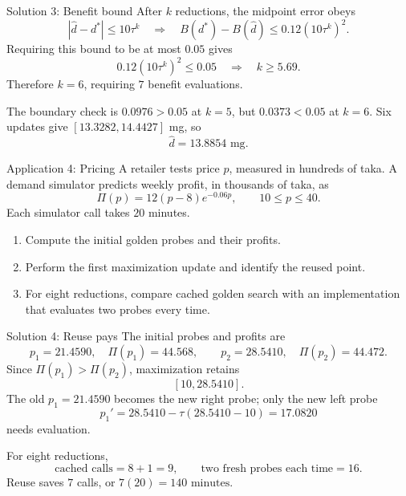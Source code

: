 \documentclass[aspectratio=169,11pt,t]{beamer}
\begin{document}
\begin{frame}{Solution 3: Benefit bound}
  After \(k\) reductions, the midpoint error obeys
  \[
    |\widehat d-d^*|\le10\tau^k
    \quad\Longrightarrow\quad
    B(d^*)-B(\widehat d)\le0.12(10\tau^k)^2.
  \]
  Requiring this bound to be at most \(0.05\) gives
  \[
    0.12(10\tau^k)^2\le0.05
    \quad\Longrightarrow\quad k\ge5.69.
  \]
  Therefore \(\boxed{k=6}\), requiring \(\boxed{7}\) benefit evaluations.

  The boundary check is \(0.0976>0.05\) at \(k=5\), but
  \(0.0373<0.05\) at \(k=6\).
  Six updates give \([13.3282,14.4427]\) mg, so
  \[
    \boxed{\widehat d=13.8854\text{ mg}}.
  \]
\end{frame}

\begin{frame}{Application 4: Pricing}
  A retailer tests price \(p\), measured in hundreds of taka. A demand simulator
  predicts weekly profit, in thousands of taka, as
  \[
    \Pi(p)=12(p-8)e^{-0.06p},
    \qquad 10\le p\le40.
  \]
  Each simulator call takes \(20\) minutes.

  \begin{enumerate}
    \item Compute the initial golden probes and their profits.
    \item Perform the first maximization update and identify the reused point.
    \item For eight reductions, compare cached golden search with an
      implementation that evaluates two probes every time.
  \end{enumerate}
\end{frame}

\begin{frame}{Solution 4: Reuse pays}
  The initial probes and profits are
  \[
    p_1=21.4590,\quad \Pi(p_1)=44.568,
    \qquad
    p_2=28.5410,\quad \Pi(p_2)=44.472.
  \]
  Since \(\Pi(p_1)>\Pi(p_2)\), maximization retains
  \[
    \boxed{[10,28.5410]}.
  \]
  The old \(p_1=21.4590\) becomes the new right probe; only the new left probe
  \[
    p_1'=28.5410-\tau(28.5410-10)=17.0820
  \]
  needs evaluation.

  For eight reductions,
  \[
    \text{cached calls}=8+1=9,
    \qquad
    \text{two fresh probes each time}=16.
  \]
  Reuse saves \(7\) calls, or \(7(20)=\boxed{140\text{ minutes}}\).
\end{frame}
\end{document}
